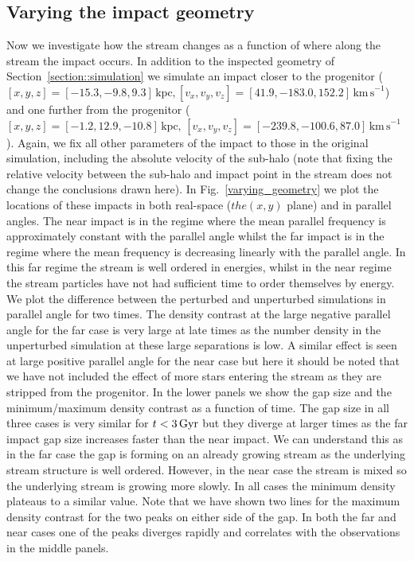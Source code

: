 \documentclass[useAMS,usenatbib,fleqn,a4paper]{mn2e}
\def\Gyr{\,{\rm Gyr}}
\begin{document}
\subsection{Varying the impact geometry}
Now we investigate how the stream changes as a function of where along the stream the impact occurs. In addition to the inspected geometry of Section~\ref{section::simulation} we simulate an impact closer to the progenitor ($[x,y,z]=[-15.3,-9.8,9.3]\,\mathrm{kpc},[v_x,v_y,v_z]=[41.9,-183.0,152.2]\,\mathrm{km\,s}^{-1}$) and one further from the progenitor ($[x,y,z]=[-1.2,12.9,-10.8]\,\mathrm{kpc},\,[v_x,v_y,v_z]=[-239.8,-100.6,87.0]\,\mathrm{km\,s}^{-1}$). Again, we fix all other parameters of the impact to those in the original simulation, including the absolute velocity of the sub-halo (note that fixing the relative velocity between the sub-halo and impact point in the stream does not change the conclusions drawn here). In Fig.~\ref{varying_geometry} we plot the locations of these impacts in both real-space ($ the (x,y)$ plane) and in parallel angles. The near impact is in the regime where the mean parallel frequency is approximately constant with the parallel angle whilst the far impact is in the regime where the mean frequency is decreasing linearly with the parallel angle. In this far regime the stream is well ordered in energies, whilst in the near regime the stream particles have not had sufficient time to order themselves by energy. We plot the difference between the perturbed and unperturbed simulations in parallel angle for two times. The density contrast at the large negative parallel angle for the far case is very large at late times as the number density in the unperturbed simulation at these large separations is low. A similar effect is seen at large positive parallel angle for the near case but here it should be noted that we have not included the effect of more stars entering the stream as they are stripped from the progenitor. In the lower panels we show the gap size and the minimum/maximum density contrast as a function of time. The gap size in all three cases is very similar for $t<3\Gyr$ but they diverge at larger times as the far impact gap size increases faster than the near impact. We can understand this as in the far case the gap is forming on an already growing stream as the underlying stream structure is well ordered. However, in the near case the stream is mixed so the underlying stream is growing more slowly. In all cases the minimum density plateaus to a similar value. Note that we have shown two lines for the maximum density contrast for the two peaks on either side of the gap. In both the far and near cases one of the peaks diverges rapidly and correlates with the observations in the middle panels.
\end{document}
